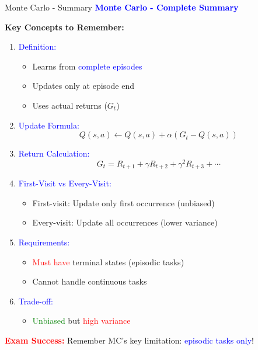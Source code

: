 \documentclass[8pt]{beamer}
\begin{document}
	\begin{frame}{Monte Carlo - Summary}
		\fontsize{6.5}{7.5}\selectfont
		\textcolor{blue}{\textbf{Monte Carlo - Complete Summary}}
		
		\textbf{Key Concepts to Remember:}
		
		\begin{enumerate}
			\item \textcolor{blue}{Definition:}
			\begin{itemize}
				\item Learns from \textcolor{blue}{complete episodes}
				\item Updates only at episode end
				\item Uses actual returns ($G_t$)
			\end{itemize}
			
			\item \textcolor{blue}{Update Formula:}
			\[
			Q(s,a) \leftarrow Q(s,a) + \alpha(G_t - Q(s,a))
			\]
			
			\item \textcolor{blue}{Return Calculation:}
			\[
			G_t = R_{t+1} + \gamma R_{t+2} + \gamma^2 R_{t+3} + \cdots
			\]
			
			\item \textcolor{blue}{First-Visit vs Every-Visit:}
			\begin{itemize}
				\item First-visit: Update only first occurrence (unbiased)
				\item Every-visit: Update all occurrences (lower variance)
			\end{itemize}
			
			\item \textcolor{blue}{Requirements:}
			\begin{itemize}
				\item \textcolor{red}{Must have} terminal states (episodic tasks)
				\item Cannot handle continuous tasks
			\end{itemize}
			
			\item \textcolor{blue}{Trade-off:}
			\begin{itemize}
				\item \textcolor{green}{Unbiased} but \textcolor{red}{high variance}
			\end{itemize}
		\end{enumerate}
		
		\textcolor{red}{\textbf{Exam Success:}} Remember MC's key limitation: \textcolor{blue}{episodic tasks only}!
	\end{frame}
	
\end{document}
